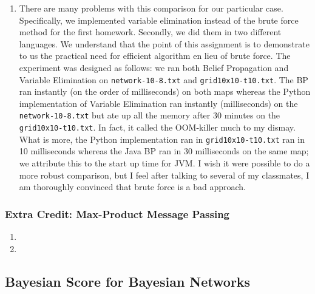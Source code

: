 \documentclass[11pt,a4paper]{article}
\begin{document}
\begin{enumerate}
		\item 
		There are many problems with this comparison for our particular case. Specifically, 
		we implemented variable elimination instead of the brute force method for the first homework.
		 Secondly, we did them in two different languages. We understand that the point of this 
		 assignment is to demonstrate to us the practical need for efficient algorithm en lieu 
		 of brute force. The experiment was designed as follows: we ran both Belief Propagation
		 and Variable Elimination on \texttt{network-10-8.txt} and \texttt{grid10x10-t10.txt}. 
		 The BP ran instantly (on the order of milliseconds) on both maps whereas the Python
		 implementation of Variable Elimination ran instantly (milliseconds) on the
		 \texttt{network-10-8.txt} but ate up all the memory after 30 minutes on the 
		 \texttt{grid10x10-t10.txt}. In fact, it called the OOM-killer much to my dismay. 
		 What is more, the Python implementation ran in \texttt{grid10x10-t10.txt} ran in 
		 10 milliseconds whereas the Java BP ran in 30 milliseconds on the same map; we 
		 attribute this to the start up time for JVM. I wish it were possible to do a more robust 
		 comparison, but I feel after talking to several of my classmates, I am thoroughly convinced 
		 that brute force is a bad approach. 
	\end{enumerate}
	
	\subsubsection{Extra Credit: Max-Product Message Passing}
	
	\begin{enumerate}
		\item
		\item 
	\end{enumerate}
	
	\subsection{Bayesian Score for Bayesian Networks}
	
\end{document}
